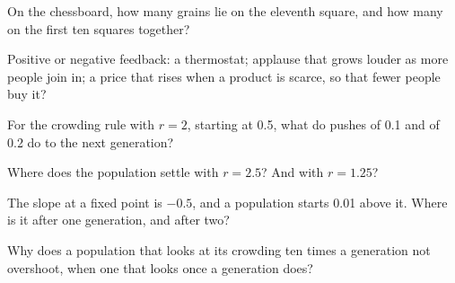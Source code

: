 \canyou

\begin{checkpoint}
\item On the chessboard, how many grains lie on the eleventh square, and how
  many on the first ten squares together?
\item Positive or negative feedback: a thermostat; applause that grows louder
  as more people join in; a price that rises when a product is scarce, so
  that fewer people buy it?
\item For the crowding rule with $r = 2$, starting at \num{0.5}, what do
  pushes of \num{0.1} and of \num{0.2} do to the next generation?
\item Where does the population settle with $r = \num{2.5}$? And with
  $r = \num{1.25}$?
\item The slope at a fixed point is $-\num{0.5}$, and a population starts
  \num{0.01} above it. Where is it after one generation, and after two?
\item Why does a population that looks at its crowding ten times a
  generation not overshoot, when one that looks once a generation does?
\end{checkpoint}
